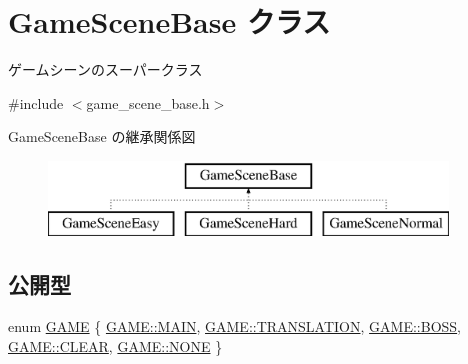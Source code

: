 \hypertarget{class_game_scene_base}{}\section{Game\+Scene\+Base クラス}
\label{class_game_scene_base}


ゲームシーンのスーパークラス  




{\ttfamily \#include $<$game\+\_\+scene\+\_\+base.\+h$>$}

Game\+Scene\+Base の継承関係図\begin{figure}[H]
\begin{center}
\leavevmode
\includegraphics[height=2.000000cm]{class_game_scene_base}
\end{center}
\end{figure}
\subsection*{公開型}
\begin{DoxyCompactItemize}
\item 
enum \mbox{\hyperlink{class_game_scene_base_a9e25ffb879e1347e9605badaa53518f3}{G\+A\+ME}} \{ \newline
\mbox{\hyperlink{class_game_scene_base_a9e25ffb879e1347e9605badaa53518f3a186495f7da296bf880df3a22a492b378}{G\+A\+M\+E\+::\+M\+A\+IN}}, 
\mbox{\hyperlink{class_game_scene_base_a9e25ffb879e1347e9605badaa53518f3a0da044e5b37e6bcb3a8d01dc7362b276}{G\+A\+M\+E\+::\+T\+R\+A\+N\+S\+L\+A\+T\+I\+ON}}, 
\mbox{\hyperlink{class_game_scene_base_a9e25ffb879e1347e9605badaa53518f3af0523bf35faf77235783d0f3e43762d2}{G\+A\+M\+E\+::\+B\+O\+SS}}, 
\mbox{\hyperlink{class_game_scene_base_a9e25ffb879e1347e9605badaa53518f3a813461e0c58e7ad59a2fd83ca2237fec}{G\+A\+M\+E\+::\+C\+L\+E\+AR}}, 
\newline
\mbox{\hyperlink{class_game_scene_base_a9e25ffb879e1347e9605badaa53518f3ab50339a10e1de285ac99d4c3990b8693}{G\+A\+M\+E\+::\+N\+O\+NE}}
 \}
\end{DoxyCompactItemize}
